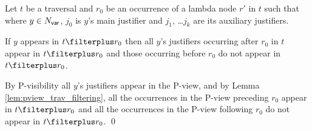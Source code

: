 \begin{lemma}
\label{lem:ifvar_in_tfilterstar_sodoes_certain_of_its_justifier}
Let $t$ be a traversal and  $r_0$ be an occurrence of a lambda node $r'$ in $t$ such that
 where $y\in N_{\sf var}$, $j_0$ is $y$'s main justifier
    and $j_1$, \ldots $j_k$ are its auxiliary justifiers.

    If $y$ appears in $t\filterplus r_0$ then all $y$'s justifiers occurring after $r_0$ in $t$ appear in $t\filterplus r_0$ and those occurring before $r_0$ do not appear in $t\filterplus r_0$.
\end{lemma}
\proof By P-visibility all $y$'s justifiers appear in the P-view,
and by Lemma \ref{lem:pview_trav_filtering}, all the occurrences in
the P-view preceding $r_0$ appear in $t\filterplus r_0$ and all the
occurrences in the P-view following $r_0$ do not appear in
$t\filterplus r_0$. \qed



